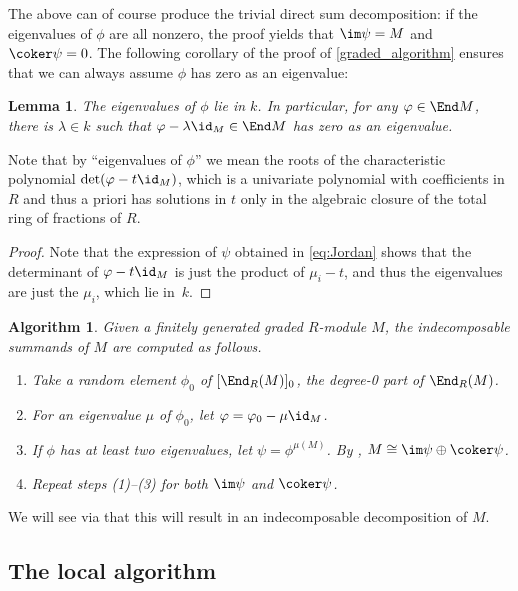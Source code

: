 \documentclass[12pt]{article}
\let\l\lambda
\theoremstyle{theorem}
\numberwithin{thm}{section}
\newtheorem{algm}[thm]{Algorithm}
\newtheorem{lem}[thm]{Lemma}
\theoremstyle{definition}
\begin{document}
The above can of course produce the trivial direct sum decomposition: if the eigenvalues of $\phi$ are all nonzero, the proof yields that $\im \psi = M$ and $\coker \psi = 0$. The following corollary of the proof of \cref{graded_algorithm} ensures that we can always assume $\phi$ has zero as an eigenvalue:

\begin{lem}
The eigenvalues of $\phi$ lie in $k$.
In particular,
for any  $\phi \in \End M$, there is $\l \in k$ such that $\phi - \l \id_M \in \End M$ has zero as an eigenvalue.
\end{lem}


Note that by ``eigenvalues of $\phi$'' we mean the roots of the characteristic polynomial $\det(\phi - t \id_M)$, which is a univariate polynomial with coefficients in $R$ and thus a priori has solutions in $t$ only in the algebraic closure of the total ring of fractions of $R$.

\begin{proof}
Note that the expression of $\psi$ obtained in \cref{eq:Jordan} shows that the determinant of $\phi - t \id_M$ is just the product of $\mu_i -t$, and thus the eigenvalues are just the $\mu_i$, which lie in~$k$.
\end{proof}

\begin{algm} Given a finitely generated graded $R$-module $M$, the indecomposable summands of $M$ are computed as follows.
  \begin{enumerate}
  \item\label{item:End0} Take a random element $\phi_0$ of $[\End_R(M)]_0$, the degree-0 part of $\End_R(M)$.
  \item For an eigenvalue $\mu $ of $\phi_0$, let $\phi=\phi_0-\mu \id_M$.
  \item If $\phi$ has at least two eigenvalues, let $\psi=\phi^{\mu(M)}$. By , $M\cong \im \psi \oplus \coker \psi$.  \item Repeat steps (1)--(3) for both $\im \psi$ and $\coker \psi$.
  \end{enumerate}
\end{algm}

We will see via  that this will result in an indecomposable decomposition of $M$.






\subsection{The local algorithm}\label{sec:main-alg}
\end{document}
